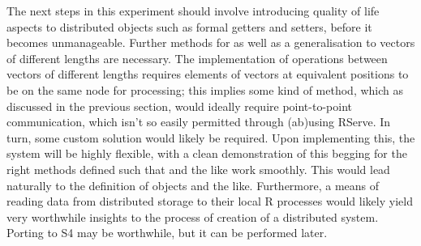 The next steps in this experiment should involve introducing quality of
life aspects to distributed objects such as formal getters and setters,
before it becomes unmanageable. Further methods for
 as well as a generalisation to vectors of
different lengths are necessary. The implementation of operations
between vectors of different lengths requires elements of vectors at
equivalent positions to be on the same node for processing; this implies
some kind of  method, which as discussed in the previous
section, would ideally require point-to-point communication, which isn't
so easily permitted through (ab)using RServe. In turn, some custom
solution would likely be required. Upon implementing this, the system
will be highly flexible, with a clean demonstration of this begging for
the right methods defined such that  and the like work
smoothly. This would lead naturally to the definition of
 objects and the like. Furthermore, a
means of reading data from distributed storage to their local R
processes would likely yield very worthwhile insights to the process of
creation of a distributed \R{} system. Porting to S4 may be worthwhile, but
it can be performed later.

